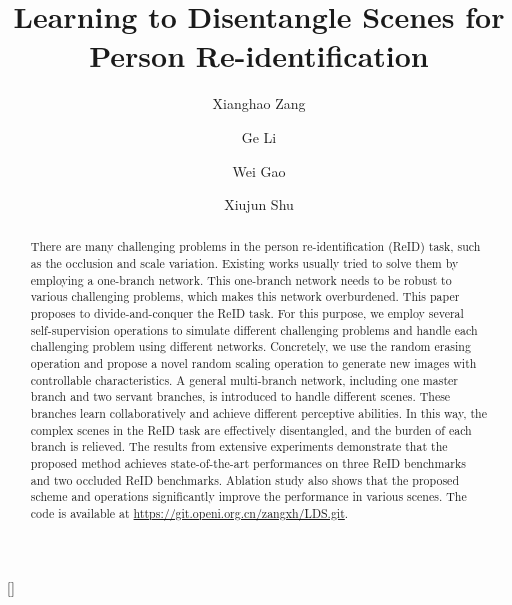 \documentclass[a4paper]{cas-dc}
\begin{document}
\let\WriteBookmarks\relax
\def\floatpagepagefraction{1}
\def\textpagefraction{.001}

\title [mode = title]{Learning to Disentangle Scenes for Person Re-identification}                

\tnotemark[1]


\author[1]{Xianghao Zang}[]
\author[1]{Ge Li}
\author[1]{Wei Gao}
\author[2]{Xiujun Shu}






\address[1]{School of Electronic and Computer Engineering, Peking University, Shenzhen 518055, China.}
\address[2]{Peng Cheng Laboratory, Shenzhen 518034, China.}

\begin{abstract}
There are many challenging problems in the person re-identification (ReID) task, such as the occlusion and scale variation. Existing works usually tried to solve them by employing a one-branch network. This one-branch network needs to be robust to various challenging problems, which makes this network overburdened. This paper proposes to divide-and-conquer the ReID task. For this purpose, we employ several self-supervision operations to simulate different challenging problems and handle each challenging problem using different networks. Concretely, we use the random erasing operation and propose a novel random scaling operation to generate new images with controllable characteristics. A general multi-branch network, including one master branch and two servant branches, is introduced to handle different scenes. These branches learn collaboratively and achieve different perceptive abilities. In this way, the complex scenes in the ReID task are effectively disentangled, and the burden of each branch is relieved. The results from extensive experiments demonstrate that the proposed method achieves state-of-the-art performances on three ReID benchmarks and two occluded ReID benchmarks. Ablation study also shows that the proposed scheme and operations significantly improve the performance in various scenes. The code is available at \href{https://git.openi.org.cn/zangxh/LDS.git}{https://git.openi.org.cn/zangxh/LDS.git}.

\end{abstract}
\end{document}
